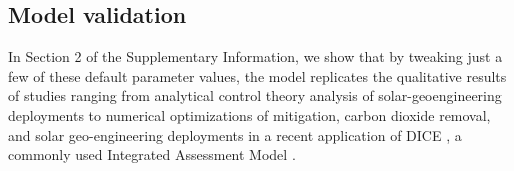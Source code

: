 \documentclass[9pt,twocolumn,twoside,lineno]{pnas-new}
\begin{document}
{\subsection*{Model validation} In Section 2 of the Supplementary Information, we show that by tweaking just a few of these default parameter values, the model replicates the qualitative results of studies ranging from analytical control theory analysis of solar-geoengineering deployments \cite{soldatenko_optimal_2018} to numerical optimizations of mitigation, carbon dioxide removal, and solar geo-engineering deployments in a recent application of DICE \cite{belaia_optimal_2019}, a commonly used Integrated Assessment Model \cite{nordhaus_optimal_1992}.

}

\showmatmethods{} %

\acknow{}

\showacknow{} %


\end{document}
